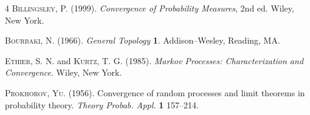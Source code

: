 \documentclass[aoas]{imsart}
\theoremstyle{plain}
\theoremstyle{definition}
\begin{document}


\begin{thebibliography}{4}
\textsc{Billingsley, P.} (1999). \textit{Convergence of
Probability Measures}, 2nd ed.
Wiley, New York.

\textsc{Bourbaki, N.}  (1966). \textit{General Topology}  \textbf{1}.
Addison--Wesley, Reading, MA.


\textsc{Ethier, S. N.} and \textsc{Kurtz, T. G.} (1985).
\textit{Markov Processes: Characterization and Convergence}.
Wiley, New York.

\textsc{Prokhorov, Yu.} (1956).
Convergence of random processes and limit theorems in probability
theory. \textit{Theory  Probab.  Appl.}
\textbf{1} 157--214.
\end{thebibliography}
\end{document}
